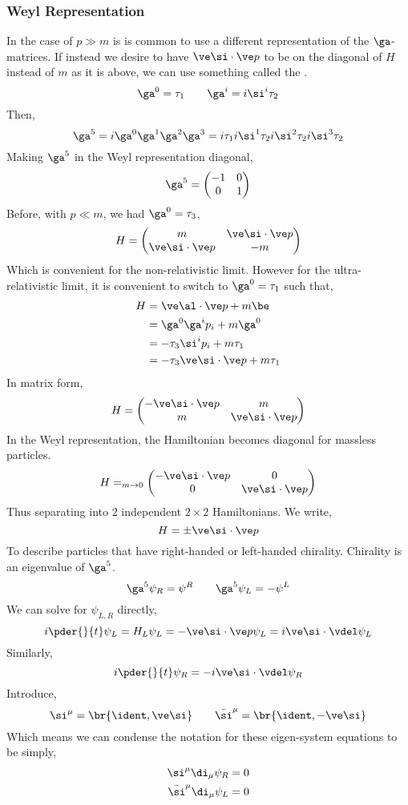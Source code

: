 \documentclass{article}
\begin{document}
\subsubsection{Weyl Representation}
In the case of $p \gg m$ is is common to use a different representation of the $\ga$-matrices. If instead we desire to have $\ve \si \cdot \ve p$ to be on the diagonal of $H$ instead of $m$ as it is above, we can use something called the .
\[ \ga^{0} = \tau_1 \qquad \ga^{i} = i \si^{i} \tau_{2} \]
Then,
\[ \ga^{5} = i \ga^{0}\ga^{1}\ga^{2}\ga^{3} = i \tau_1 i \si^{1} \tau_{2}i \si^{2} \tau_{2}i \si^{3} \tau_{2}  \]
Making $\ga^{5}$ in the Weyl representation diagonal,
\[ \ga^{5} = \begin{pmatrix} -1 & 0 \\ 0 & 1 \end{pmatrix} \]
Before, with $p \ll m$, we had $\ga^{0} = \tau_{3}$,
\[ H = \begin{pmatrix} m & \ve \si \cdot \ve p \\ \ve \si \cdot \ve p & -m \end{pmatrix} \]
Which is convenient for the non-relativistic limit. However for the ultra-relativistic limit, it is convenient to switch to $\ga^{0} = \tau_{1}$ such that,
\begin{align*}
H
&= \ve \al \cdot \ve p + m \be \\
&= \ga^{0} \ga^{i}p_i  + m \ga^{0} \\
&= -\tau_3\si^{i}p_i  + m \tau_1 \\
&= -\tau_3\ve \si \cdot \ve p  + m \tau_1
\end{align*}
In matrix form,
\[ H = \begin{pmatrix} -\ve \si \cdot \ve p & m \\ m & \ve \si \cdot \ve p \end{pmatrix} \]
In the Weyl representation, the Hamiltonian becomes diagonal for massless particles.
\[ H =_{m \to 0} \begin{pmatrix} -\ve \si \cdot \ve p & 0 \\ 0 & \ve \si \cdot \ve p \end{pmatrix} \]
Thus separating into $2$ independent $2 \times 2$ Hamiltonians. We write,
\[ H = \pm \ve \si \cdot \ve p \]
To describe particles that have right-handed or left-handed chirality. Chirality is an eigenvalue of $\ga^{5}$.
\[ \ga^{5} \psi_{R} = \psi^{R} \qquad \ga^{5} \psi_{L} = -\psi^{L}\]
We can solve for $\psi_{L,R}$ directly,
\[ i \pder{}{t} \psi_L = H_L \psi_L = - \ve \si  \cdot \ve p \psi_{L} = i \ve \si \cdot \vdel \psi_L \]
Similarly,
\[ i \pder{}{t} \psi_R = - i \ve \si \cdot \vdel \psi_R \]
Introduce,
\[ \si^{\mu} = \br{\ident, \ve \si} \qquad \bar \si^{\mu} = \br{\ident, -\ve \si}\]
Which means we can condense the notation for these eigen-system equations to be simply,
\begin{align*}
    \si^{\mu} \di_{\mu} \psi_{R} &= 0 \\
    \bar \si^{\mu} \di_{\mu} \psi_{L} &= 0
\end{align*}
\end{document}
